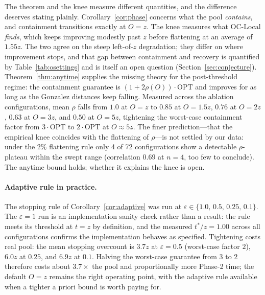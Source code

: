 \documentclass[twoside,leqno,twocolumn]{article}
\newcommand{\OPT}{\mathrm{OPT}}
\begin{document}
The theorem and the knee measure different quantities, and the
difference deserves stating plainly. Corollary~\ref{cor:phase}
concerns what the pool \emph{contains}, and containment transitions
exactly at $O=z$. The knee measures what OC-Local \emph{finds}, which
keeps improving modestly past $z$ before flattening at an average of
$1.55z$. The two agree on the steep left-of-$z$ degradation; they
differ on where improvement stops, and that gap between containment
and recovery is quantified by Table~\ref{tab:osettings} and is itself
an open question (Section~\ref{sec:conjecture}).
Theorem~\ref{thm:anytime} supplies the missing theory for the
post-threshold regime: the containment guarantee is
$(1+2\rho(O))\cdot\OPT$ and improves for as long as the Gonzalez
distances keep falling. Measured across the ablation configurations,
mean $\rho$ falls from $1.0$ at $O=z$ to $0.85$ at $O=1.5z$, $0.76$ at
$O=2z$, $0.63$ at $O=3z$, and $0.50$ at $O=5z$, tightening the
worst-case containment factor from $3\cdot\OPT$ to $2\cdot\OPT$ at
$O\approx5z$. The finer prediction---that the empirical knee coincides
with the flattening of $\rho$---is not settled by our data: under the
$2\%$ flattening rule only 4 of 72 configurations show a detectable
$\rho$-plateau within the swept range (correlation $0.69$ at $n=4$,
too few to conclude). The anytime bound holds; whether it explains the
knee is open.

\paragraph{Adaptive rule in practice.}
The stopping rule of Corollary~\ref{cor:adaptive} was run at
$\varepsilon\in\{1.0,\,0.5,\,0.25,\,0.1\}$. The $\varepsilon=1$ run is
an implementation sanity check rather than a result: the rule meets
its threshold at $t=z$ by definition, and the measured $t^{*}/z=1.00$
across all configurations confirms the implementation behaves as
specified. Tightening costs real pool: the mean stopping overcount is
$3.7z$ at $\varepsilon=0.5$ (worst-case factor $2$), $6.0z$ at
$0.25$, and $6.9z$ at $0.1$. Halving the worst-case guarantee from $3$
to $2$ therefore costs about $3.7\times$ the pool and proportionally
more Phase-2 time; the default $O=z$ remains the right operating
point, with the adaptive rule available when a tighter a priori bound
is worth paying for.
\end{document}
